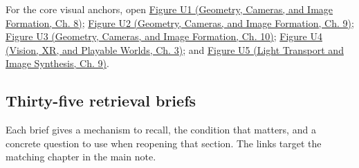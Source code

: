 For the core visual anchors, open \href{../03-Geometry-Cameras-and-Image-Formation/main.pdf\#nameddest=03-visual-computing-i-ch001-figure-u1---linear-maps-separate-directions-stretches-and-output-placement}{Figure U1 (Geometry, Cameras, and Image Formation, Ch. 8)}; \href{../03-Geometry-Cameras-and-Image-Formation/main.pdf\#nameddest=03-visual-computing-i-ch002-figure-u2---a-half-edge-separates-face-traversal-from-edge-traversal}{Figure U2 (Geometry, Cameras, and Image Formation, Ch. 9)}; \href{../03-Geometry-Cameras-and-Image-Formation/main.pdf\#nameddest=03-visual-computing-i-ch003-figure-u3---two-signals-can-share-the-same-samples}{Figure U3 (Geometry, Cameras, and Image Formation, Ch. 10)}; \href{../07-Vision-XR-and-Playable-Worlds/main.pdf\#nameddest=04-visual-computing-ii-ch032-figure-u4---lighting-rank-determines-which-normal-components-can-be-measured}{Figure U4 (Vision, XR, and Playable Worlds, Ch. 3)}; and \href{../04-Light-Transport-and-Image-Synthesis/main.pdf\#nameddest=04-visual-computing-ii-ch035-figure-u5---a-direct-light-renderer-makes-the-pipeline-executable}{Figure U5 (Light Transport and Image Synthesis, Ch. 9)}.

\subsection{Thirty-five retrieval briefs}\label{appendix-a8f634b076b5-thirty-five-retrieval-briefs}

\hypertarget{appendix-a8f634b076b5-thirty-five-retrieval-briefs}{}

Each brief gives a mechanism to recall, the condition that matters, and a concrete question to use when reopening that section. The links target the matching chapter in the main note.

